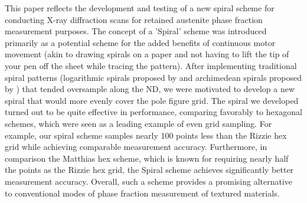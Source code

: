 \documentclass{article}
\begin{document}
This paper reflects the development and testing of a new spiral scheme for conducting X-ray diffraction scans for retained austenite phase fraction measurement purposes. The concept of a 'Spiral' scheme was introduced primarily as a potential scheme for the added benefits of continuous motor movement (akin to drawing spirals on a paper and not having to lift the tip of your pen off the sheet while tracing the pattern). After implementing traditional spiral patterns (logarithmic spirals proposed by \cite{rizzie_elaboration_2008} and archimedean spirals proposed by \cite{holden_spiralscanning_1953}) that tended oversample along the ND, we were motivated to develop a new spiral that would more evenly cover the pole figure grid.
The spiral we developed turned out to be quite effective in performance, comparing favorably to hexagonal schemes, which were seen as a leading example of even grid sampling. For example, our spiral scheme samples nearly 100 points less than the Rizzie hex grid while achieving comparable measurement accuracy. Furthermore, in comparison the Matthias hex scheme, which is known for requiring nearly half the points as the Rizzie hex grid, the Spiral scheme achieves significantly better measurement accuracy. Overall, such a scheme provides a promising alternative to conventional modes of phase fraction measurement of textured materials.



\end{document}

